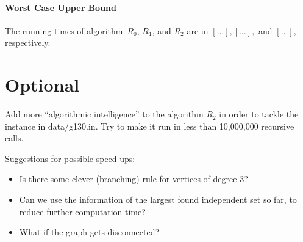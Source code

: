 \documentclass{tufte-handout}
\begin{document}
\paragraph{Worst Case Upper Bound}
The running times of algorithm~$R_0$, $R_1$, and $R_2$ are in
$[\ldots],[\ldots],$ and $[\ldots]$, respectively. \newpage

\section{Optional}
Add more ``algorithmic intelligence'' to the algorithm $R_2$ in order to tackle the instance in data/g130.in.
Try to make it run in less than 10,000,000 recursive calls. 

Suggestions for possible speed-ups:
\begin{itemize}
\item Is there some clever (branching) rule for vertices of degree 3?
\item Can we use the information of the largest found independent set so far, to reduce further computation time?
\item What if the graph gets disconnected?
\end{itemize}
\end{document}
